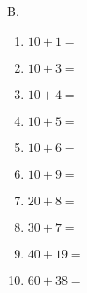 \documentclass[a4paper,12pt]{article}
\begin{document}
\begin{multicols}{3}
\columnbreak  %

B.
\begin{enumerate}[label=\arabic*.]
    \item \textbf{\Large $10 + 1 =$} \underline{\hspace{1cm}} \vspace{0.5cm}
    \item \textbf{\Large $10 + 3 =$} \underline{\hspace{1cm}} \vspace{0.5cm}
    \item \textbf{\Large $10 + 4 =$} \underline{\hspace{1cm}} \vspace{0.5cm} 
    \item \textbf{\Large $10 + 5 =$} \underline{\hspace{1cm}} \vspace{0.5cm} 
    \item \textbf{\Large $10 + 6 =$} \underline{\hspace{1cm}} \vspace{0.5cm} 
    \item \textbf{\Large $10 + 9 =$} \underline{\hspace{1cm}} \vspace{.5cm}
    \item \textbf{\Large $20 + 8 =$} \underline{\hspace{1cm}} \vspace{.5cm}
    \item \textbf{\Large $30 + 7 =$} \underline{\hspace{1cm}} \vspace{.5cm}
    \item \textbf{\Large $40 + 19 =$} \underline{\hspace{1cm}} \vspace{.5cm}
    \item \textbf{\Large $60 + 38 =$} \underline{\hspace{1cm}} \vspace{.5cm} 
\end{enumerate}


\end{multicols}
\end{document}
